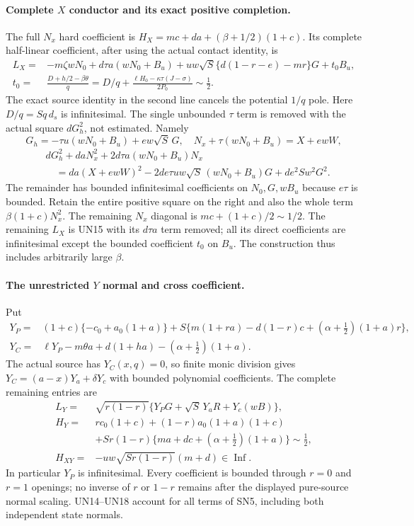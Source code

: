 \paragraph{Complete $X$ conductor and its exact positive completion.}
The full $N_x$ hard coefficient is
$H_X=mc+da+(\beta+1/2)(1+c)$. Its complete half-linear
coefficient, after using the actual contact identity, is
\[
\begin{split}
 L_X={}&-m\zeta wN_0+d\tau a(wN_0+B_u)
        +uw\sqrt S\{d(1-r-e)-mr\}G+t_0B_u,\\
 t_0={}&\frac{D+h/2-\beta\theta}{q}
       =D/q+\frac{\ell H_0-\kappa\tau(J-\sigma)}{2P_0}
          \sim\tfrac12.
\end{split}\tag{UN15}
\]
The exact source identity in the second line cancels the potential
$1/q$ pole. Here $D/q=S q\,d_s$ is infinitesimal. The single
unbounded $\tau$ term is removed with the actual square $dG_h^2$,
not estimated. Namely
\[
 G_h=-\tau u(wN_0+B_u)+ew\sqrt S\,G,\quad
 N_x+\tau(wN_0+B_u)=X+ewW,
\]
\[
\begin{split}
 &dG_h^2+daN_x^2+2d\tau a(wN_0+B_u)N_x\\
 &\quad=da(X+ewW)^2
       -2de\tau uw\sqrt S\,(wN_0+B_u)G+de^2Sw^2G^2.
\end{split}\tag{UN16}
\]
The remainder has bounded infinitesimal coefficients on $N_0,G,wB_u$
because $e\tau$ is bounded. Retain the entire positive square on the
right and also the whole term $\beta(1+c)N_x^2$. The remaining
$N_x$ diagonal is $mc+(1+c)/2\sim1/2$. The remaining $L_X$ is
UN15 with its $d\tau a$ term removed; all its direct coefficients
are infinitesimal except the bounded coefficient $t_0$ on $B_u$.
The construction thus includes arbitrarily large $\beta$.

\paragraph{The unrestricted $Y$ normal and cross coefficient.}
Put
\[
\begin{split}
 Y_P={}&(1+c)\{-c_0+a_0(1+a)\}
 +S\{m(1+ra)-d(1-r)c+(\alpha+\tfrac12)(1+a)r\},\\
 Y_C={}&\ell Y_P-m\theta a+d(1+ha)-(\alpha+\tfrac12)(1+a).
\end{split}\tag{UN17}
\]
The actual source has $Y_C(x,q)=0$, so finite monic division gives
$Y_C=(a-x)Y_a+\delta Y_c$ with bounded polynomial coefficients.
The complete remaining entries are
\[
\begin{split}
 L_Y={}&\sqrt{r(1-r)}\{Y_PG+\sqrt S\,Y_aR+Y_c(wB)\},\\
 H_Y={}&rc_0(1+c)+(1-r)a_0(1+a)(1+c)\\
 &+Sr(1-r)\{ma+dc+(\alpha+\tfrac12)(1+a)\}\sim\tfrac12,\\
 H_{XY}={}&-uw\sqrt{Sr(1-r)}(m+d)\in\operatorname{Inf}.
\end{split}\tag{UN18}
\]
In particular $Y_P$ is infinitesimal. Every coefficient is bounded
through $r=0$ and $r=1$ openings; no inverse of $r$ or $1-r$ remains
after the displayed pure-source normal scaling. UN14--UN18 account
for all terms of SN5, including both independent state normals.

